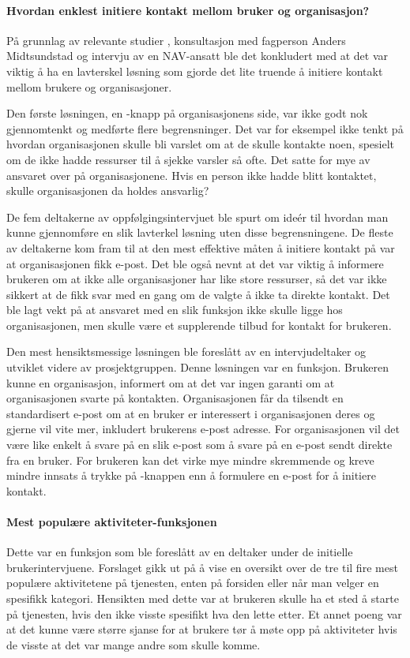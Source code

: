 \paragraph{Hvordan enklest initiere kontakt mellom bruker og organisasjon?} 
På grunnlag av relevante studier %
, konsultasjon med fagperson Anders Midtsundstad \cite{MIDTSUNDSTAD-INTERVJU:15} og intervju av en NAV-ansatt \cite{NAV-INTERVJU:16} ble det konkludert med at det var viktig å ha en lavterskel løsning som gjorde det lite truende å initiere kontakt mellom brukere og organisasjoner.

Den første løsningen, en -knapp på organisasjonens side, var ikke godt nok gjennomtenkt og medførte flere begrensninger. Det var for eksempel ikke tenkt på hvordan organisasjonen skulle bli varslet om at de skulle kontakte noen, spesielt om de ikke hadde ressurser til å sjekke varsler så ofte. Det satte for mye av ansvaret over på organisasjonene. Hvis en person ikke hadde blitt kontaktet, skulle organisasjonen da holdes ansvarlig?

De fem deltakerne av oppfølgingsintervjuet ble spurt om ideér til hvordan man kunne gjennomføre en slik lavterkel løsning uten disse begrensningene. De fleste av deltakerne kom fram til at den mest effektive måten å initiere kontakt på var at organisasjonen fikk e-post. Det ble også nevnt at det var viktig å informere brukeren om at ikke alle organisasjoner har like store ressurser, så det var ikke sikkert at de fikk svar med en gang om de valgte å ikke ta direkte kontakt. Det ble lagt vekt på at ansvaret med en slik funksjon ikke skulle ligge hos organisasjonen, men skulle være et supplerende tilbud for kontakt for brukeren. 

Den mest hensiktsmessige løsningen ble foreslått av en intervjudeltaker og utviklet videre av prosjektgruppen. Denne løsningen var en  funksjon. Brukeren kunne  en organisasjon, informert om at det var ingen garanti om at organisasjonen svarte på kontakten. Organisasjonen får da tilsendt en standardisert e-post om at en bruker er interessert i organisasjonen deres og gjerne vil vite mer, inkludert brukerens e-post adresse. For organisasjonen vil det være like enkelt å svare på en slik e-post som å svare på en e-post sendt direkte fra en bruker. For brukeren kan det virke mye mindre skremmende og kreve mindre innsats å trykke på -knappen enn å formulere en e-post for å initiere kontakt.

\paragraph{Mest populære aktiviteter-funksjonen}
Dette var en funksjon som ble foreslått av en deltaker under de initielle brukerintervjuene. Forslaget gikk ut på å vise en oversikt over de tre til fire mest populære aktivitetene på tjenesten, enten på forsiden eller når man velger en spesifikk kategori. Hensikten med dette var at brukeren skulle ha et sted å starte på tjenesten, hvis den ikke visste spesifikt hva den lette etter. Et annet poeng var at det kunne være større sjanse for at brukere tør å møte opp på aktiviteter hvis de visste at det var mange andre som skulle komme.

